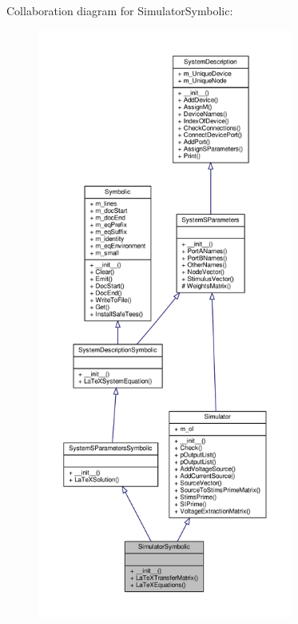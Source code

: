 Collaboration diagram for Simulator\+Symbolic\+:
\nopagebreak
\begin{figure}[H]
\begin{center}
\leavevmode
\includegraphics[height=550pt]{classSignalIntegrity_1_1SystemDescriptions_1_1SimulatorSymbolic_1_1SimulatorSymbolic__coll__graph}
\end{center}
\end{figure}
